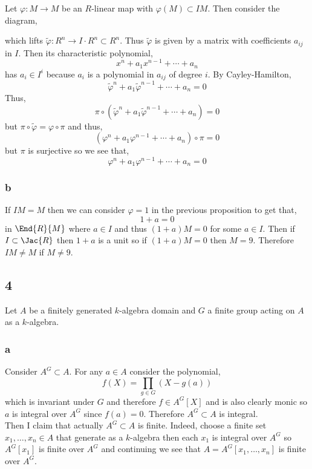 \documentclass[12pt]{article}
\begin{document}
Let $\varphi : M \to M$ be an $R$-linear map with $\varphi(M) \subset I M$. Then consider the diagram,
\begin{center}
\end{center}
which lifts $\tilde{\varphi} : R^n \to I \cdot R^n \subset R^n$. Thus $\tilde{\varphi}$ is given by a matrix with coefficients $a_{ij}$ in $I$. Then its characteristic polynomial,
\[ x^n + a_1 x^{n-1} + \cdots + a_n \]
has $a_i \in I^i$ because $a_i$ is a polynomial in $a_{ij}$ of degree $i$. By Cayley-Hamilton,
\[ \tilde{\varphi}^n + a_1 \tilde{\varphi}^{n-1} + \cdots + a_n = 0 \]
Thus,
\[ \pi \circ (\tilde{\varphi}^n + a_1 \tilde{\varphi}^{n-1} + \cdots + a_n) = 0 \]
but $\pi \circ \tilde{\varphi} = \varphi \circ \pi$ and thus,
\[ (\varphi^n + a_1 \varphi^{n-1} + \cdots + a_n) \circ \pi = 0 \]
but $\pi$ is surjective so we see that,
\[ \varphi^n + a_1 \varphi^{n-1} + \cdots + a_n = 0 \]

\subsubsection{b}

If $IM = M$ then we can consider $\varphi = 1$ in the previous proposition to get that,
\[ 1 + a = 0 \]
in $\End{R}{M}$ where $a \in I$ and thus $(1 + a) M = 0$ for some $a \in I$. Then if $I \subset \Jac{R}$ then $1 + a$ is a unit so if $(1 + a) M = 0$ then $M = 9$. Therefore $I M \neq M$ if $M \neq 9$.

\subsection{4}

Let $A$ be a finitely generated $k$-algebra domain and $G$ a finite group acting on $A$ as a $k$-algebra.

\subsubsection{a}

Consider $A^G \subset A$. For any $a \in A$ consider the polynomial,
\[ f(X) = \prod_{g \in G} (X - g(a)) \]
which is invariant under $G$ and therefore $f \in A^G[X]$ and is also clearly monic so $a$ is integral over $A^G$ since $f(a) = 0$. Therefore $A^G \subset A$ is integral.
\bigskip\\
Then I claim that actually $A^G \subset A$ is finite. Indeed, choose a finite set $x_1, \dots, x_n \in A$ that generate as a $k$-algebra then each $x_1$ is integral over $A^G$ so $A^G[x_1]$ is finite over $A^G$ and continuing we see that $A = A^G[x_1, \dots, x_n]$ is finite over $A^G$.
\end{document}
